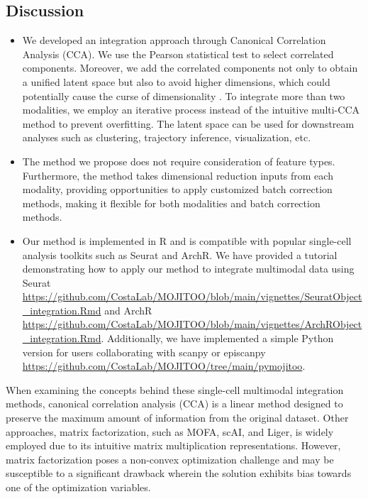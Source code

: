 \subsection{Discussion}
\begin{itemize}

    \item We developed an integration approach through Canonical Correlation Analysis (CCA). We use the Pearson statistical test to select correlated components. Moreover, we add the correlated components not only to obtain a unified latent space but also to avoid higher dimensions, which could potentially cause the curse of dimensionality \citep{Dreyfus2003}. To integrate more than two modalities, we employ an iterative process instead of the intuitive multi-CCA method to prevent overfitting. The latent space can be used for downstream analyses such as clustering, trajectory inference, visualization, etc.


    \item The method we propose does not require consideration of feature types. Furthermore, the method takes dimensional reduction inputs from each modality, providing opportunities to apply customized batch correction methods, making it flexible for both modalities and batch correction methods.

    \item Our method is implemented in R and is compatible with popular single-cell analysis toolkits such as Seurat and ArchR. We have provided a tutorial demonstrating how to apply our method to integrate multimodal data using Seurat \url{https://github.com/CostaLab/MOJITOO/blob/main/vignettes/SeuratObject_integration.Rmd} and ArchR \url{https://github.com/CostaLab/MOJITOO/blob/main/vignettes/ArchRObject_integration.Rmd}. Additionally, we have implemented a simple Python version for users collaborating with scanpy or episcanpy \url{https://github.com/CostaLab/MOJITOO/tree/main/pymojitoo}.
\end{itemize}

When examining the concepts behind these single-cell multimodal integration methods, canonical correlation analysis (CCA) is a linear method designed to preserve the maximum amount of information from the original dataset. Other approaches, matrix factorization, such as MOFA, scAI, and Liger, is widely employed due to its intuitive matrix multiplication representations. However, matrix factorization poses a non-convex optimization challenge and may be susceptible to a significant drawback wherein the solution exhibits bias towards one of the optimization variables.

